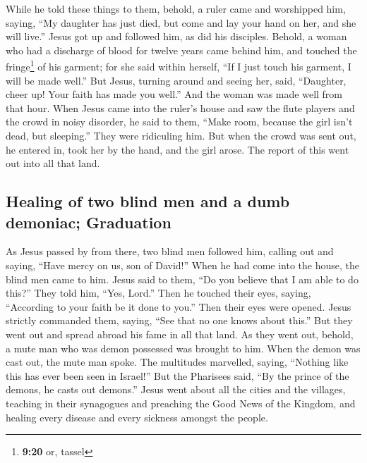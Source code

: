  While he told these things to them, behold, a ruler came
and worshipped him, saying, ``My daughter has just died, but come and
lay your hand on her, and she will live.''  Jesus got up
and followed him, as did his disciples.  Behold, a woman
who had a discharge of blood for twelve years came behind him, and
touched the fringe\footnote{\textbf{9:20} or, tassel} of his garment;
 for she said within herself, ``If I just touch his
garment, I will be made well.''  But Jesus, turning
around and seeing her, said, ``Daughter, cheer up! Your faith has made
you well.'' And the woman was made well from that hour. 
When Jesus came into the ruler's house and saw the flute players and the
crowd in noisy disorder,  he said to them, ``Make room,
because the girl isn't dead, but sleeping.'' They were ridiculing him.
 But when the crowd was sent out, he entered in, took her
by the hand, and the girl arose.  The report of this went
out into all that land.

\hypertarget{healing-of-two-blind-men-and-a-dumb-demoniac-graduation}{%
\subsection{Healing of two blind men and a dumb demoniac;
Graduation}\label{healing-of-two-blind-men-and-a-dumb-demoniac-graduation}}

 As Jesus passed by from there, two blind men followed
him, calling out and saying, ``Have mercy on us, son of David!''
 When he had come into the house, the blind men came to
him. Jesus said to them, ``Do you believe that I am able to do this?''
They told him, ``Yes, Lord.''  Then he touched their
eyes, saying, ``According to your faith be it done to you.''
 Then their eyes were opened. Jesus strictly commanded
them, saying, ``See that no one knows about this.''  But
they went out and spread abroad his fame in all that land.
 As they went out, behold, a mute man who was demon
possessed was brought to him.  When the demon was cast
out, the mute man spoke. The multitudes marvelled, saying, ``Nothing
like this has ever been seen in Israel!''  But the
Pharisees said, ``By the prince of the demons, he casts out demons.''
 Jesus went about all the cities and the villages,
teaching in their synagogues and preaching the Good News of the Kingdom,
and healing every disease and every sickness amongst the people.

